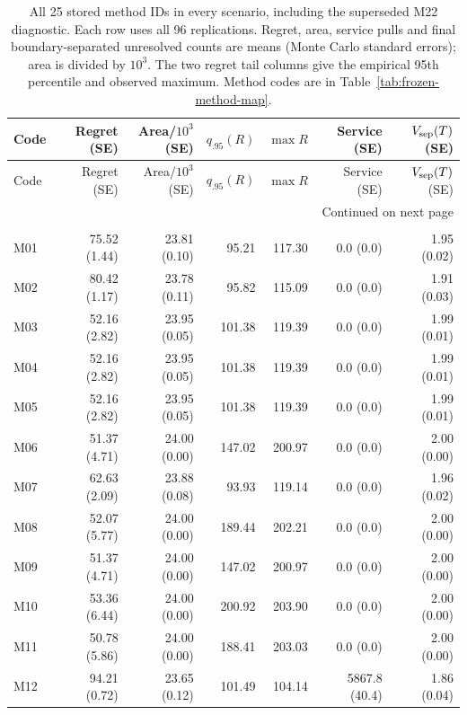 \documentclass[11pt]{article}
\theoremstyle{remark}
\begin{document}
\begingroup
\fontsize{8}{10}\selectfont
\setlength{\tabcolsep}{4pt}
\begin{longtable}{lrrrrrr}
\caption{All 25 stored method IDs in every scenario, including the superseded M22 diagnostic. Each row uses all 96 replications. Regret, area, service pulls and final boundary-separated unresolved counts are means (Monte Carlo standard errors); area is divided by $10^3$. The two regret tail columns give the empirical 95th percentile and observed maximum. Method codes are in Table~\ref{tab:frozen-method-map}.}\label{tab:all-methods}\\
\toprule
Code & Regret (SE) & Area/$10^3$ (SE) & $q_{.95}(R)$ & $\max R$ & Service (SE) & $V_{\rm sep}(T)$ (SE) \\
\midrule
\endfirsthead
\toprule
Code & Regret (SE) & Area/$10^3$ (SE) & $q_{.95}(R)$ & $\max R$ & Service (SE) & $V_{\rm sep}(T)$ (SE) \\
\midrule
\endhead
\midrule
\multicolumn{7}{r}{Continued on next page}\\
\endfoot
\bottomrule
\endlastfoot
\multicolumn{7}{l}{\textit{Two close arms}} \\
M01 & 75.52 (1.44) & 23.81 (0.10) & 95.21 & 117.30 & 0.0 (0.0) & 1.95 (0.02) \\
M02 & 80.42 (1.17) & 23.78 (0.11) & 95.82 & 115.09 & 0.0 (0.0) & 1.91 (0.03) \\
M03 & 52.16 (2.82) & 23.95 (0.05) & 101.38 & 119.39 & 0.0 (0.0) & 1.99 (0.01) \\
M04 & 52.16 (2.82) & 23.95 (0.05) & 101.38 & 119.39 & 0.0 (0.0) & 1.99 (0.01) \\
M05 & 52.16 (2.82) & 23.95 (0.05) & 101.38 & 119.39 & 0.0 (0.0) & 1.99 (0.01) \\
M06 & 51.37 (4.71) & 24.00 (0.00) & 147.02 & 200.97 & 0.0 (0.0) & 2.00 (0.00) \\
M07 & 62.63 (2.09) & 23.88 (0.08) & 93.93 & 119.14 & 0.0 (0.0) & 1.96 (0.02) \\
M08 & 52.07 (5.77) & 24.00 (0.00) & 189.44 & 202.21 & 0.0 (0.0) & 2.00 (0.00) \\
M09 & 51.37 (4.71) & 24.00 (0.00) & 147.02 & 200.97 & 0.0 (0.0) & 2.00 (0.00) \\
M10 & 53.36 (6.44) & 24.00 (0.00) & 200.92 & 203.90 & 0.0 (0.0) & 2.00 (0.00) \\
M11 & 50.78 (5.86) & 24.00 (0.00) & 188.41 & 203.03 & 0.0 (0.0) & 2.00 (0.00) \\
M12 & 94.21 (0.72) & 23.65 (0.12) & 101.49 & 104.14 & 5867.8 (40.4) & 1.86 (0.04) \\

\end{longtable}
\end{document}

